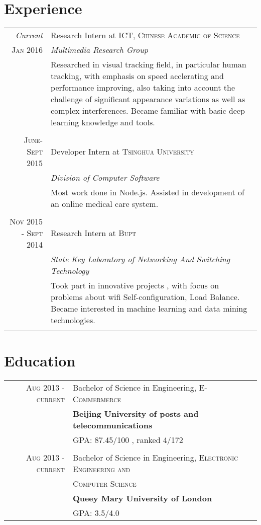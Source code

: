 \documentclass[a4paper,10pt]{article}
\begin{document}
\section{Experience}
\begin{tabular}{r|p{11cm}}
 \emph{Current} & Research Intern at \textsc{ICT, Chinese Academic of Science} \\\textsc{Jan 2016}&\emph{Multimedia Research Group}\\&\footnotesize{Researched in visual tracking field, in particular human tracking, with emphasis on speed acclerating and performance improving, also taking into account the challenge of significant appearance variations as well as complex interferences. Became familiar with basic deep learning knowledge and tools.}\\\multicolumn{2}{c}{} \\
 \textsc{June-Sept 2015} & Developer Intern at \textsc{Tsinghua University}  \\&\emph{Division of Computer Software}\\&\footnotesize{Most work done in Node.js. Assisted in development of an online medical care system.}\\\multicolumn{2}{c}{} \\
 \textsc{Nov 2015 - Sept 2014} & Research Intern at \textsc{Bupt}  \\&\emph{State Key Laboratory of Networking And Switching Technology}\\&\footnotesize{Took part in innovative projects , with focus on problems about wifi Self-configuration, Load Balance. Became interested in machine learning and data mining technologies.}\\\multicolumn{2}{c}{} \\
\end{tabular}

\section{Education}
\begin{tabular}{rl}	
 \textsc{Aug 2013} - \textsc{current} & Bachelor of Science in Engineering, \textsc{E-Commermerce}\\
& \textbf{Beijing University of posts and telecommunications}\\
& \textsc{GPA: 87.45/100}  , ranked \textsc{4/172}\\
\\

 \textsc{Aug 2013} - \textsc{current} & Bachelor of Science in Engineering, \textsc{Electronic Engineering and}\\
&  \textsc{Computer Science}\\
& \textbf{Queey Mary University of London}\\
& \textsc{GPA: 3.5/4.0}  \\
\end{tabular}
\end{document}
